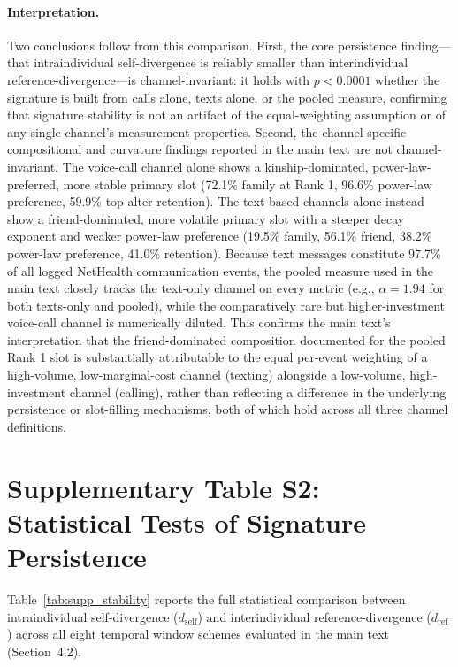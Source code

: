 \documentclass[11pt,letterpaper]{article}
\newcommand{\dself}{d_{\mathrm{self}}}
\newcommand{\dref}{d_{\mathrm{ref}}}
\begin{document}
\paragraph{Interpretation.} Two conclusions follow from this comparison. First, the core persistence finding---that intraindividual self-divergence is reliably smaller than interindividual reference-divergence---is channel-invariant: it holds with $p < 0.0001$ whether the signature is built from calls alone, texts alone, or the pooled measure, confirming that signature stability is not an artifact of the equal-weighting assumption or of any single channel's measurement properties. Second, the channel-specific compositional and curvature findings reported in the main text are not channel-invariant. The voice-call channel alone shows a kinship-dominated, power-law-preferred, more stable primary slot (72.1\% family at Rank 1, 96.6\% power-law preference, 59.9\% top-alter retention). The text-based channels alone instead show a friend-dominated, more volatile primary slot with a steeper decay exponent and weaker power-law preference (19.5\% family, 56.1\% friend, 38.2\% power-law preference, 41.0\% retention). Because text messages constitute 97.7\% of all logged NetHealth communication events, the pooled measure used in the main text closely tracks the text-only channel on every metric (e.g., $\alpha = 1.94$ for both texts-only and pooled), while the comparatively rare but higher-investment voice-call channel is numerically diluted. This confirms the main text's interpretation that the friend-dominated composition documented for the pooled Rank 1 slot is substantially attributable to the equal per-event weighting of a high-volume, low-marginal-cost channel (texting) alongside a low-volume, high-investment channel (calling), rather than reflecting a difference in the underlying persistence or slot-filling mechanisms, both of which hold across all three channel definitions.

\clearpage
\section*{Supplementary Table S2: Statistical Tests of Signature Persistence}

Table~\ref{tab:supp_stability} reports the full statistical comparison between intraindividual self-divergence ($\dself$) and interindividual reference-divergence ($\dref$) across all eight temporal window schemes evaluated in the main text (Section~4.2).
\end{document}
